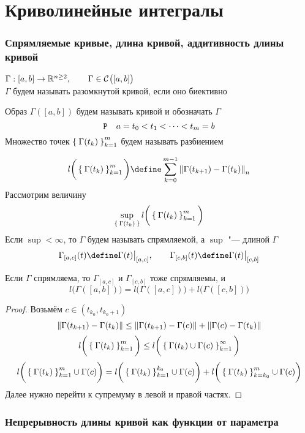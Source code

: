 \part{Криволинейные интегралы}

\section{Спрямляемые кривые, длина кривой, аддитивность длины кривой}

\begin{definition}
	$ \Gamma : [a, b] \to \R^{n \ge 2}, \qquad \Gamma \in \Cont{[a, b]} $ \\
	$ \Gamma $ будем называть разомкнутой кривой, если оно биективно
\end{definition}

Образ $ \Gamma([a, b]) $ будем называть кривой и обозначать $ \Gamma $
$$ \Par \quad a = t_0 < t_1 < \dots < t_m = b $$
Множество точек $ \seq[m]{\Gamma(t_k)}k $ будем называть разбиением

$$ l \bigg( \seq[m]{\Gamma(t_k)}k \bigg) \define \sum_{k = 0}^{m - 1} \norm{\Gamma(t_{k + 1}) - \Gamma(t_k)}_n $$
Рассмотрим величину
$$ \sup\limits_{\set{\Gamma(t_k)}} l \bigg( \seq[m]{\Gamma(t_k)}k \bigg) $$
Если $ \sup < \infty $, то $ \Gamma $ будем называть спрямляемой, а $ \sup $ "--- длиной $ \Gamma $
$$ \Gamma_{[a, c]}(t) \define \Gamma(t)\clamp{[a, c]}, \qquad \Gamma_{[c, b]} (t) \define \Gamma(t)\clamp{[c, b]} $$

\begin{statement}
	Если $ \Gamma $ спрямляема, то $ \Gamma_{[a, c]} $ и $ \Gamma_{[c, b]} $ тоже спрямляемы, и
	$$ l \bigg( \Gamma([a, b]) \bigg) = l \bigg( \Gamma([a, c]) \bigg) + l \bigg( \Gamma([c, b]) \bigg) $$
\end{statement}

\begin{proof}
	Возьмём $ c \in (t_{k_0}, t_{k_0 + 1}) $
	$$ \norm{\Gamma(t_{k + 1}) - \Gamma(t_k)} \le \norm{\Gamma(t_{k + 1}) - \Gamma(c)} + \norm{\Gamma(c) - \Gamma(t_k)} $$
	$$ l \bigg( \seq[m]{\Gamma(t_k)}k \bigg) \le l \bigg( \seq{\Gamma(t_k) \cup \Gamma(c)}k \bigg) $$
	$$ l \bigg( \seq[m]{\Gamma(t_k)}k \cup \Gamma(c) \bigg) = l \bigg( \seq[k_0]{\Gamma(t_k)}k \cup \Gamma(c) \bigg) + l \bigg( \seqv[m]{\Gamma(t_k)}k{k_0} \cup \Gamma(c) \bigg) $$
	Далее нужно перейти к супремуму в левой и правой частях.
\end{proof}

\section{Непрерывность длины кривой как функции от параметра}

